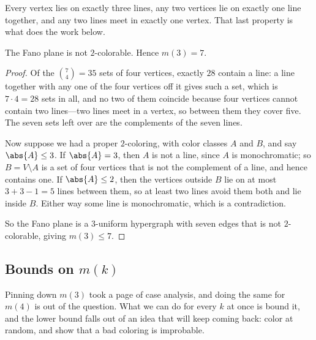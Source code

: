 Every vertex lies on exactly three lines, any two vertices lie on exactly one line together, and any two lines meet in exactly one vertex. That last property is what does the work below.

\begin{boxproposition}
    The Fano plane is not $2$-colorable. Hence $m(3) = 7$.
\end{boxproposition}
\begin{proof}
    Of the $\binom{7}{4} = 35$ sets of four vertices, exactly $28$ contain a line: a line together with any one of the four vertices off it gives such a set, which is $7 \cdot 4 = 28$ sets in all, and no two of them coincide because four vertices cannot contain two lines---two lines meet in a vertex, so between them they cover five. The seven sets left over are the complements of the seven lines.

    Now suppose we had a proper $2$-coloring, with color classes $A$ and $B$, and say $\abs{A} \leq 3$. If $\abs{A} = 3$, then $A$ is not a line, since $A$ is monochromatic; so $B = V \setminus A$ is a set of four vertices that is not the complement of a line, and hence contains one. If $\abs{A} \leq 2$, then the vertices outside $B$ lie on at most $3 + 3 - 1 = 5$ lines between them, so at least two lines avoid them both and lie inside $B$. Either way some line is monochromatic, which is a contradiction.

    So the Fano plane is a $3$-uniform hypergraph with seven edges that is not $2$-colorable, giving $m(3) \leq 7$.
\end{proof}

\subsection{Bounds on $m(k)$}

Pinning down $m(3)$ took a page of case analysis, and doing the same for $m(4)$ is out of the question. What we can do for every $k$ at once is bound it, and the lower bound falls out of an idea that will keep coming back: color at random, and show that a bad coloring is improbable.

